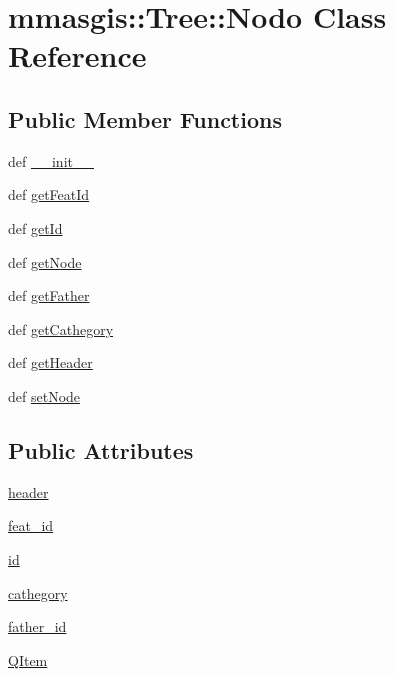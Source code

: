 \hypertarget{classmmasgis_1_1Tree_1_1Nodo}{
\section{mmasgis::Tree::Nodo Class Reference}
\label{classmmasgis_1_1Tree_1_1Nodo}
}
\subsection*{Public Member Functions}
\begin{DoxyCompactItemize}
\item 
def \hyperlink{classmmasgis_1_1Tree_1_1Nodo_afbd55e5817ce37da325a51b2dad96eff}{\_\-\_\-init\_\-\_\-}
\item 
def \hyperlink{classmmasgis_1_1Tree_1_1Nodo_a43280f451ef1fe51c503f08659fff4b4}{getFeatId}
\item 
def \hyperlink{classmmasgis_1_1Tree_1_1Nodo_a8f41bb5f132efbd2add6645f80e1a39c}{getId}
\item 
def \hyperlink{classmmasgis_1_1Tree_1_1Nodo_a4b6aeb037ec5589964797e98b67fd472}{getNode}
\item 
def \hyperlink{classmmasgis_1_1Tree_1_1Nodo_a26eaa5ab2f59cfa857cd8014a9608930}{getFather}
\item 
def \hyperlink{classmmasgis_1_1Tree_1_1Nodo_aceed0821f84bca09dbe46242c2ffe77b}{getCathegory}
\item 
def \hyperlink{classmmasgis_1_1Tree_1_1Nodo_a159196d07d62acd7ded0087f52376044}{getHeader}
\item 
def \hyperlink{classmmasgis_1_1Tree_1_1Nodo_a30b4b0fa4d990d46ca52ea8e699187cd}{setNode}
\end{DoxyCompactItemize}
\subsection*{Public Attributes}
\begin{DoxyCompactItemize}
\item 
\hyperlink{classmmasgis_1_1Tree_1_1Nodo_a30738bb35d193b4c6e61fd63acd79326}{header}
\item 
\hyperlink{classmmasgis_1_1Tree_1_1Nodo_a07e717036e6d84d279917132cee27fe8}{feat\_\-id}
\item 
\hyperlink{classmmasgis_1_1Tree_1_1Nodo_a496136284f23687076e518a20fad5752}{id}
\item 
\hyperlink{classmmasgis_1_1Tree_1_1Nodo_a9c8640dd185de1d0a484428dcfa0e8e9}{cathegory}
\item 
\hyperlink{classmmasgis_1_1Tree_1_1Nodo_a9176ca6301420550f4dc6f00862c29eb}{father\_\-id}
\item 
\hyperlink{classmmasgis_1_1Tree_1_1Nodo_ae60f9eb9bcf716fbf821c2d75b189740}{QItem}
\end{DoxyCompactItemize}


